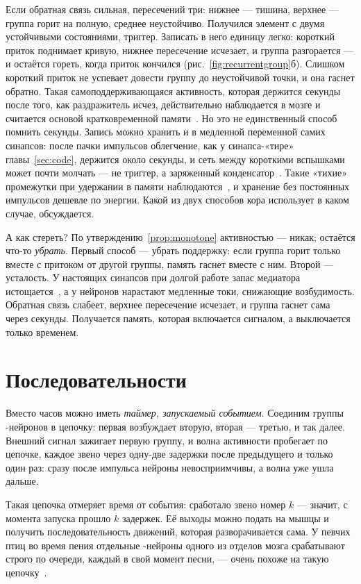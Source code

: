 Если обратная связь сильная, пересечений три: нижнее --- тишина, верхнее --- группа горит на полную, среднее неустойчиво. Получился элемент с двумя устойчивыми состояниями, триггер. Записать в него единицу легко: короткий приток поднимает кривую, нижнее пересечение исчезает, и группа разгорается --- и остаётся гореть, когда приток кончился (рис.~\ref{fig:recurrentgroup}б). Слишком короткий приток не успевает довести группу до неустойчивой точки, и она гаснет обратно. Такая самоподдерживающаяся активность, которая держится секунды после того, как раздражитель исчез, действительно наблюдается в мозге и считается основой кратковременной памяти~\cite{Wang2001}. Но это не единственный способ помнить секунды. Запись можно хранить и в медленной переменной самих синапсов: после пачки импульсов облегчение, как у синапса-«тире» главы~\ref{sec:code}, держится около секунды, и сеть между короткими вспышками может почти молчать --- не триггер, а заряженный конденсатор~\cite{Mongillo2008}. Такие «тихие» промежутки при удержании в памяти наблюдаются~\cite{Stokes2015}, и хранение без постоянных импульсов дешевле по энергии. Какой из двух способов кора использует в каком случае, обсуждается.

А как стереть? По утверждению~\ref{prop:monotone} активностью --- никак; остаётся что-то \emph{убрать}. Первый способ --- убрать поддержку: если группа горит только вместе с притоком от другой группы, память гаснет вместе с ним. Второй --- усталость. У настоящих синапсов при долгой работе запас медиатора истощается~\cite{Tsodyks1997}, а у нейронов нарастают медленные токи, снижающие возбудимость. Обратная связь слабеет, верхнее пересечение исчезает, и группа гаснет сама через секунды. Получается память, которая включается сигналом, а выключается только временем.

\section{Последовательности}

Вместо часов можно иметь \emph{таймер, запускаемый событием}. Соединим группы -нейронов в цепочку: первая возбуждает вторую, вторая --- третью, и так далее. Внешний сигнал зажигает первую группу, и волна активности пробегает по цепочке, каждое звено через одну-две задержки после предыдущего и только один раз: сразу после импульса нейроны невосприимчивы, а волна уже ушла дальше.

Такая цепочка отмеряет время от события: сработало звено номер $k$ --- значит, с момента запуска прошло $k$ задержек. Её выходы можно подать на мышцы и получить последовательность движений, которая разворачивается сама. У певчих птиц во время пения отдельные -нейроны одного из отделов мозга срабатывают строго по очереди, каждый в свой момент песни, --- очень похоже на такую цепочку~\cite{Hahnloser2002}.

